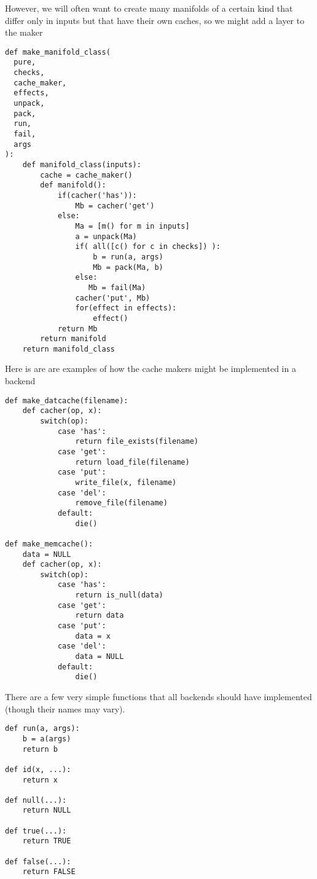 \documentclass[12pt]{article}
\begin{document}
However, we will often want to create many manifolds of a certain kind that
differ only in inputs but that have their own caches, so we might add a layer
to the maker

\begin{verbatim}
def make_manifold_class(
  pure,
  checks,
  cache_maker,
  effects,
  unpack,
  pack,
  run,
  fail,
  args
):
    def manifold_class(inputs):
        cache = cache_maker()
        def manifold():
            if(cacher('has')):
                Mb = cacher('get')
            else:
                Ma = [m() for m in inputs]
                a = unpack(Ma)
                if( all([c() for c in checks]) ):
                    b = run(a, args)
                    Mb = pack(Ma, b)
                else:
                   Mb = fail(Ma)
                cacher('put', Mb)
                for(effect in effects):
                    effect()
            return Mb
        return manifold
    return manifold_class
\end{verbatim}

Here is are are examples of how the cache makers might be implemented in
a backend

\begin{verbatim}
def make_datcache(filename):
    def cacher(op, x):
        switch(op):
            case 'has':
                return file_exists(filename)
            case 'get':
                return load_file(filename)
            case 'put':
                write_file(x, filename)
            case 'del':
                remove_file(filename)
            default:
                die()

def make_memcache():
    data = NULL
    def cacher(op, x):
        switch(op):
            case 'has':
                return is_null(data)
            case 'get':
                return data
            case 'put':
                data = x
            case 'del':
                data = NULL
            default:
                die()
\end{verbatim}

There are a few very simple functions that all backends should have implemented
(though their names may vary).

\begin{verbatim}
def run(a, args):
    b = a(args)
    return b

def id(x, ...):
    return x

def null(...):
    return NULL

def true(...):
    return TRUE

def false(...):
    return FALSE
\end{verbatim}
\end{document}
